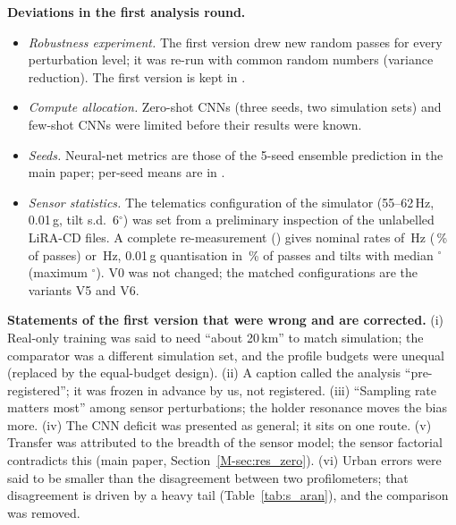 \documentclass[onecolumn,10pt]{IEEEtran}
\begin{document}
\textbf{Deviations in the first analysis round.}
\begin{itemize}
\item \emph{Robustness experiment.} The first version drew new random passes for every perturbation level; it was re-run with common random numbers (variance reduction). The first version is kept in .
\item \emph{Compute allocation.} Zero-shot CNNs (three seeds, two simulation sets) and few-shot CNNs were limited before their results were known.
\item \emph{Seeds.} Neural-net metrics are those of the 5-seed ensemble prediction in the main paper; per-seed means are in .
\item \emph{Sensor statistics.} The telematics configuration of the simulator (55--62\,Hz, 0.01\,g, tilt s.d.\ 6$^\circ$) was set from a preliminary inspection of the unlabelled LiRA-CD files. A complete re-measurement () gives nominal rates of \liraRateLow\,Hz (\liraRateLowShare\,\% of passes) or \liraRateHigh\,Hz, 0.01\,g quantisation in \liraLsbShare\,\% of passes and tilts with median \liraTiltMedian$^\circ$ (maximum \liraTiltMax$^\circ$). V0 was not changed; the matched configurations are the variants V5 and V6.
\end{itemize}

\textbf{Statements of the first version that were wrong and are corrected.}
(i) Real-only training was said to need ``about 20\,km'' to match simulation; the comparator was a different simulation set, and the profile budgets were unequal (replaced by the equal-budget design). (ii) A caption called the analysis ``pre-registered''; it was frozen in advance by us, not registered. (iii) ``Sampling rate matters most'' among sensor perturbations; the holder resonance moves the bias more. (iv) The CNN deficit was presented as general; it sits on one route. (v) Transfer was attributed to the breadth of the sensor model; the sensor factorial contradicts this (main paper, Section~\ref{M-sec:res_zero}). (vi) Urban errors were said to be smaller than the disagreement between two profilometers; that disagreement is driven by a heavy tail (Table~\ref{tab:s_aran}), and the comparison was removed.
\end{document}
